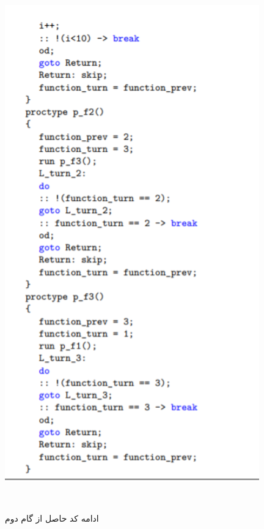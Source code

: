\begin{figure}
	\centering
	\includegraphics[height=23cm,width=11cm]{j2.png}
	\caption{ادامه کد حاصل از گام دوم}
	\centering
\end{figure}


